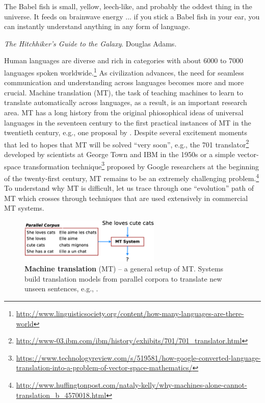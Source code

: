 \epigraph{The Babel fish is small, yellow, leech-like, and probably the oddest
thing in the universe. It feeds on brainwave energy  ...
if you stick a Babel fish in your ear, you can
instantly understand anything in any form of language.}{{\it The Hitchhiker's
Guide to the Galaxy}.
Douglas Adams.}
Human languages are diverse and rich in categories with about 6000 to 7000
languages spoken worldwide.\footnote{\url{http://www.linguisticsociety.org/content/how-many-languages-are-there-world}}
As civilization advances, the need for seamless communication and understanding across
languages becomes more and more crucial. Machine translation (MT), the
task of teaching machines to learn to translate automatically across languages, as
a result, is an important research area.
MT has a long history \cite{hutchins07} from the original
phiosophical ideas of universal languages in the seventeen century to the 
first practical instances of MT in the twentieth century, e.g., one proposal by
. Despite several excitement moments that led to hopes that MT
will be solved ``very soon'', e.g., the 701 translator\footnote{\url{http://www-03.ibm.com/ibm/history/exhibits/701/701_translator.html}}
developed by scientists at George Town and IBM in the 1950s or a simple
vector-space transformation
technique\footnote{\url{https://www.technologyreview.com/s/519581/how-google-converted-language-translation-into-a-problem-of-vector-space-mathematics/}} proposed by Google researchers at the beginning of the twenty-first
century,
MT remains to be an extremely challenging
problem.\footnote{\url{http://www.huffingtonpost.com/nataly-kelly/why-machines-alone-cannot-translation_b_4570018.html}}
To understand why MT is difficult, let us trace through one ``evolution''
path of %
MT which crosses through techniques that are used extensively in
commercial MT systems. 

\begin{figure}
\centering
\includegraphics[width=0.6\textwidth, clip=true, trim= 0 0 0 0]{img/mt} %
\caption[A general setup of machine translation]{{\bf Machine translation} (MT) -- a general setup of MT. Systems
build translation models from parallel corpora to translate new unseen
sentences, e.g., .}
\label{f:mt}
\end{figure}

